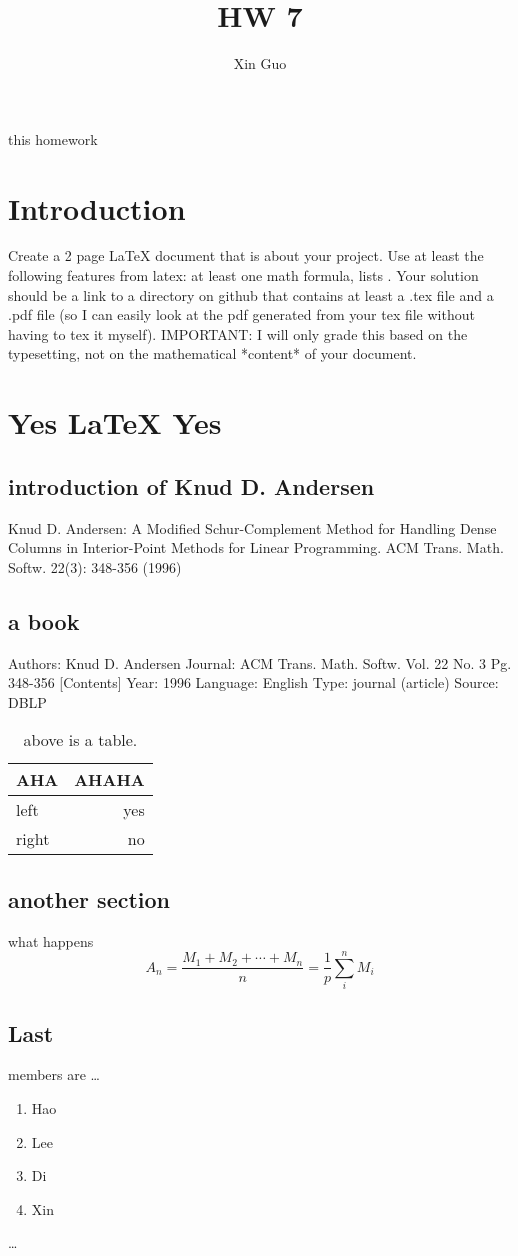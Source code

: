 \documentclass[13pt]{article}
\title{HW 7}
\author{Xin Guo}
\begin{document}
\maketitle

\begin{AHA}
this homework
\end{AHA}

\section{Introduction}

Create a 2 page LaTeX document that is about your project. Use at least the following features from latex: at least one math formula, lists . Your solution should be a link to a directory on github that contains at least a .tex file and a .pdf file (so I can easily look at the pdf generated from your tex file without having to tex it myself). IMPORTANT: I will only grade this based on the typesetting, not on the mathematical *content* of your document.

\section{Yes \LaTeX{} Yes}
\label{sec:examples}

\subsection{introduction of Knud D. Andersen}
Knud D. Andersen: A Modified Schur-Complement Method for Handling Dense Columns in Interior-Point Methods for Linear Programming. ACM Trans. Math. Softw. 22(3): 348-356 (1996)


\subsection{a book}


Authors: Knud D. Andersen 
Journal: ACM Trans. Math. Softw. Vol. 22 No. 3 Pg. 348-356 [Contents] 
Year: 1996 
Language: English 
Type: journal (article) 
Source: DBLP


\begin{table}
\centering
\begin{tabular}{l|r}
AHA & AHAHA \\\hline
left & yes \\
right & no
\end{tabular}
\caption{\label{tab:widgets}above is a table.}
\end{table}

\subsection{another section}

 what happens 
$$A_n = \frac{M_1 + M_2 + \cdots + M_n}{n}
      = \frac{1}{p}\sum_{i}^{n} M_i$$


\subsection{Last}

members are \dots

\begin{enumerate}
\item Hao
\item Lee
\item Di
\item Xin
\end{enumerate}
\dots 
\end{document}
